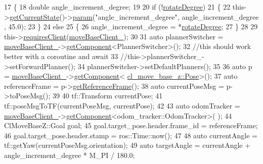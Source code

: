 \begin{DoxyCode}
17 \{
18     \textcolor{keywordtype}{double} angle\_increment\_degree;
19 
20     \textcolor{keywordflow}{if} (!\hyperlink{classcl__move__base__z_1_1CbRotate_a83e9f97e917044f919c98a55d8e00db6}{rotateDegree})
21     \{
22         this->\hyperlink{classsmacc_1_1ISmaccClientBehavior_a34fde34e48fa13db622ee60d8374d0b8}{getCurrentState}()->\hyperlink{classsmacc_1_1ISmaccState_a4f2ff8e3eda8aa9bbb60c8ff17d0def1}{param}(\textcolor{stringliteral}{"angle\_increment\_degree"}, angle\_increment\_degree
      , 45.0);
23     \}
24     \textcolor{keywordflow}{else}
25     \{
26         angle\_increment\_degree = *\hyperlink{classcl__move__base__z_1_1CbRotate_a83e9f97e917044f919c98a55d8e00db6}{rotateDegree};
27     \}
28 
29     this->\hyperlink{classsmacc_1_1ISmaccClientBehavior_a32b16e99e3b4cb289414203dc861a440}{requiresClient}(\hyperlink{classcl__move__base__z_1_1CbRotate_a390623f5bcbdad18fe2a65428e4621cb}{moveBaseClient\_});
30 
31     \textcolor{keyword}{auto} plannerSwitcher = \hyperlink{classcl__move__base__z_1_1CbRotate_a390623f5bcbdad18fe2a65428e4621cb}{moveBaseClient\_}->\hyperlink{classsmacc_1_1ISmaccClient_adef78db601749ca63c19e74a27cb88cc}{getComponent}<PlannerSwitcher>();
32     \textcolor{comment}{//this should work better with a coroutine and await}
33     \textcolor{comment}{//this->plannerSwitcher\_->setForwardPlanner();}
34     plannerSwitcher->setDefaultPlanners();
35 
36     \textcolor{keyword}{auto} p = \hyperlink{classcl__move__base__z_1_1CbRotate_a390623f5bcbdad18fe2a65428e4621cb}{moveBaseClient\_}->\hyperlink{classsmacc_1_1ISmaccClient_adef78db601749ca63c19e74a27cb88cc}{getComponent}<
      \hyperlink{classcl__move__base__z_1_1Pose}{cl\_move\_base\_z::Pose}>();
37     \textcolor{keyword}{auto} referenceFrame = p->\hyperlink{classcl__move__base__z_1_1Pose_af8c2dc151e74aa8da6b283d1c8563051}{getReferenceFrame}();
38     \textcolor{keyword}{auto} currentPoseMsg = p->toPoseMsg();
39 
40     tf::Transform currentPose;
41     tf::poseMsgToTF(currentPoseMsg, currentPose);
42 
43     \textcolor{keyword}{auto} odomTracker = \hyperlink{classcl__move__base__z_1_1CbRotate_a390623f5bcbdad18fe2a65428e4621cb}{moveBaseClient\_}->\hyperlink{classsmacc_1_1ISmaccClient_adef78db601749ca63c19e74a27cb88cc}{getComponent}<odom\_tracker::OdomTracker>(
      );
44     ClMoveBaseZ::Goal goal;
45     goal.target\_pose.header.frame\_id = referenceFrame;
46     goal.target\_pose.header.stamp = ros::Time::now();
47 
48     \textcolor{keyword}{auto} currentAngle = tf::getYaw(currentPoseMsg.orientation);
49     \textcolor{keyword}{auto} targetAngle = currentAngle + angle\_increment\_degree * M\_PI / 180.0;

\end{DoxyCode}

